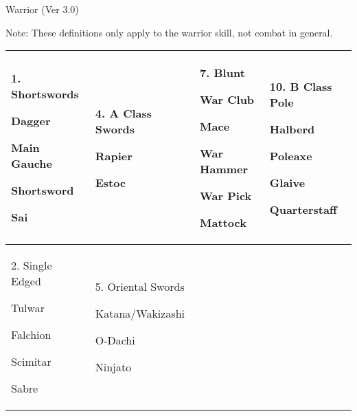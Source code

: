 \begin{Chapter}{Warrior (Ver 3.0)}
\begin{table*}
Note: These definitions only apply to the warrior skill, not combat in general. 

\medskip

\begin{tabularx}{\textwidth}{|X|X|X|X|} \hline
1. Shortswords
\begin{Itemize}
\item Dagger
\item Main Gauche
\item Shortsword
\item Sai
\end{Itemize}

&

4. A Class Swords  
\begin{Itemize}
\item Rapier
\item Estoc
\end{Itemize}

&

7. Blunt
\begin{Itemize}
\item War Club  
\item Mace  
\item War Hammer  
\item War Pick  
\item Mattock 
\end{Itemize}

&

10. B Class Pole
\begin{Itemize}
\item Halberd  
\item Poleaxe
\item Glaive
\item Quarterstaff
\end{Itemize}
\\ \hline

2. Single Edged
\begin{Itemize}
\item Tulwar
\item Falchion
\item Scimitar
\item Sabre
\end{Itemize}

&

5. Oriental Swords
\begin{Itemize}
\item Katana/Wakizashi
\item O-Dachi
\item Ninjato
\end{Itemize}


\end{tabularx}
\end{table*}
\end{Chapter}
